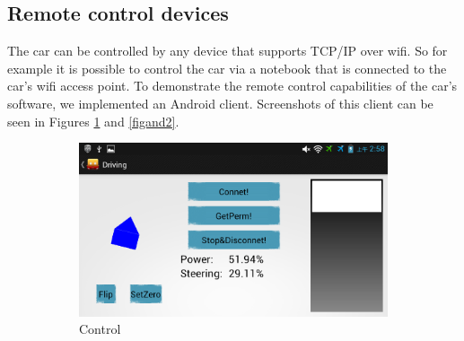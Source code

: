 \documentclass[a4paper
               ,10pt
               ,DIV=10 %
               ,BCOR=0.3cm
               ,pagesize %
               ,headings=small
               ,bibtotoc
               ]
               {scrartcl}
\begin{document}
\subsection{Remote control devices}
The car can be controlled by any device that supports TCP/IP over wifi.
So for example it is possible to control the car via a notebook that is connected to the car's wifi access point.
To demonstrate the remote control capabilities of the car's software, we implemented an Android client. Screenshots of this client can be seen in Figures \ref{figand1} and \ref{figand2}.
\begin{figure}[H]
  \centering
  \begin{subfigure}[b]{0.7\textwidth}
    \centering
    \includegraphics[width=\textwidth]{pic/figand1.png}
    \caption{Control}
		\label{figand1}
  \end{subfigure}~
  \begin{subfigure}[b]{0.3\textwidth}
    \centering

\end{subfigure}
\end{figure}
\end{document}
